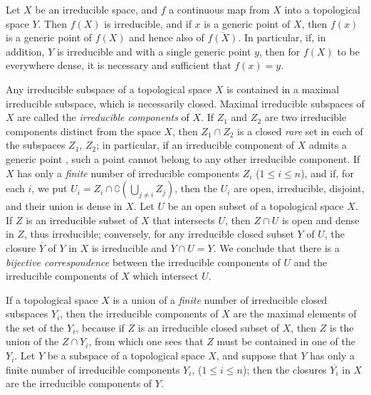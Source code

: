\begin{env}[2.1.5]
\label{0.2.1.5}
Let $X$ be an irreducible space, and $f$ a continuous map from $X$ into a topological space $Y$.
Then $f(X)$ is irreducible, and if $x$ is a generic point of $X$, then $f(x)$ is a generic point of $f(X)$ and hence also of $\overline{f(X)}$. 
In particular, if, in addition, $Y$ is irreducible and with a single generic point $y$, then for $f(X)$ to be everywhere dense, it is necessary and sufficient that $f(x)=y$.
\end{env}

\begin{env}[2.1.6]
\label{0.2.1.6}
Any irreducible subspace of a topological space $X$ is contained in a maximal irreducible subspace, which is necessarily closed.
Maximal irreducible subspaces of $X$ are called the \emph{irreducible components} of $X$.
If $Z_1$ and $Z_2$ are two irreducible components distinct from the space $X$, then $Z_1\cap Z_2$ is a closed \emph{rare} set in each of the subspaces $Z_1$, $Z_2$; in particular, if an irreducible component of $X$ admits a generic point , such a point cannot belong to any other irreducible component.
If $X$ has only a \emph{finite} number of irreducible components $Z_i$ ($1\leq i\leq n$), and if, for each $i$, we put
$U_i=Z_i\cap\complement{(\bigcup_{j\neq i}Z_j)}$, then the $U_i$ are open, irreducible, disjoint, and their union is dense in $X$.
Let $U$ be an open subset of a topological space $X$.
If $Z$ is an irreducible subset of $X$ that intersects $U$, then $Z\cap U$ is open and dense in $Z$, thus irreducible; conversely, for any irreducible closed subset $Y$ of $U$, the closure $\overline{Y}$ of $Y$ in $X$ is irreducible and $\overline{Y}\cap U=Y$.
We conclude that there is a \emph{bijective correspondence} between the irreducible components of $U$ and the irreducible components of $X$ which intersect $U$.
\end{env}

\begin{env}[2.1.7]
\label{0.2.1.7}
If a topological space $X$ is a union of a \emph{finite} number of irreducible closed subspaces $Y_i$, then the irreducible components of $X$ are the maximal elements of the set of the $Y_i$, because if $Z$ is an irreducible closed subset of $X$, then $Z$ is the union of the $Z\cap Y_i$, from which one sees that $Z$ must be contained in one of the $Y_i$.
Let $Y$ be a subspace of a topological space $X$, and suppose that $Y$ has only a finite number of irreducible components $Y_i$, ($1\leq i\leq n$); then the closures $\overline{Y_i}$ in $X$ are the irreducible components of $Y$.
\end{env}

